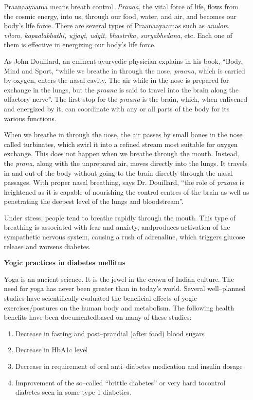 Praanaayaama means breath control. \textit{Pranaa}, the vital force of life, flows from the cosmic energy, into us, through our food, water, and air, and becomes our body’s life force. There are several types of Praanaayaamas such as \textit{anulom vilom, kapaalabhathi, ujjayi, udgit, bhastrika, suryabhedana}, etc. Each one of them is effective in energizing our body’s life force.

As John Douillard, an eminent ayurvedic physician explains in his book, “Body, Mind and Sport, “while we breathe in through the nose, \textit{praana}, which is carried by oxygen, enters the nasal cavity. The air while in the nose is prepared for exchange in the lungs, but the \textit{praana} is said to travel into the brain along the olfactory nerve”. The first stop for the \textit{praana} is the brain, which, when enlivened and energized by it, can coordinate with any or all parts of the body for its various functions.

When we breathe in through the nose, the air passes by small bones in the nose called turbinates, which swirl it into a refined stream most suitable for oxygen exchange. This does not happen when we breathe through the mouth. Instead, the \textit{prana}, along with the unprepared air, moves directly into the lungs. It travels in and out of the body without going to the brain directly through the nasal passages. With proper nasal breathing, says Dr. Douillard, “the role of \textit{praana} is heightened as it is capable of nourishing the control centres of the brain as well as penetrating the deepest level of the lungs and bloodstream”.

Under stress, people tend to breathe rapidly through the mouth. This type of breathing is associated with fear and anxiety, and\break produces activation of the sympathetic nervous system, causing a rush of adrenaline, which triggers glucose release and worsens diabetes.

\noindent\textbf{Yogic practices in diabetes mellitus}

Yoga is an ancient science. It is the jewel in the crown of Indian culture. The need for yoga has never been greater than in today’s world. Several well–planned studies have scientifically evaluated the beneficial effects of yogic exercises/postures on the human body and metabolism. The following health benefits have been documented\break based on many of these studies:

\begin{enumerate}[•]
\itemsep=0pt
\item Decrease in fasting and post–prandial (after food) blood sugars
\item Decrease in HbA1c level
\item Decrease in requirement of oral anti–diabetes medication and insulin dosage
\item Improvement of the so–called “brittle diabetes” or very hard to\break control diabetes seen in some type 1 diabetics.
\end{enumerate}

